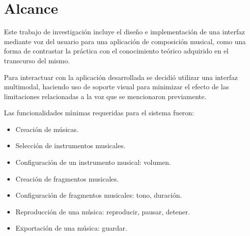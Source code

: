 \section{Alcance}
\label{sec:problema-especifico}

Este trabajo de investigaci\'on incluye el dise\~no e implementaci\'on de
una interfaz mediante voz del usuario para una aplicaci\'on de composici\'on musical,
como una forma de contrastar la pr\'actica con el conocimiento te\'orico adquirido en
el transcurso del mismo.

Para interactuar con la aplicaci\'on desarrollada se decidi\'o utilizar una interfaz
multimodal, haciendo uso de soporte visual para minimizar el efecto de las limitaciones
relacionadas a la voz que se mencionaron previamente.

Las funcionalidades m{\'\i}nimas requeridas para el sistema fueron:
\begin{itemize}
	\item Creaci\'on de m\'usicas.
	\item Selecci\'on de instrumentos musicales.
	\item Configuraci\'on de un instrumento musical: volumen.
	\item Creaci\'on de fragmentos musicales.
	\item Configuraci\'on de fragmentos musicales: tono, duraci\'on.
	\item Reproducci\'on de una m\'usica: reproducir, pausar, detener.
	\item Exportaci\'on de una m\'usica: guardar.
\end{itemize}